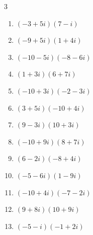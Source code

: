 \begin{multicols}{3}
\begin{enumerate}
        \phantom{$\displaystyle =90+18i$}

  \item $\displaystyle (-3+5i)(7-i)$

        \phantom{$\displaystyle =-16+38i$}

  \item $\displaystyle (-9+5i)(1+4i)$

        \phantom{$\displaystyle =-29-31i$}

  \item $\displaystyle (-10-5i)(-8-6i)$

        \phantom{$\displaystyle =50+100i$}

  \item $\displaystyle (1+3i)(6+7i)$

        \phantom{$\displaystyle =-15+25i$}

  \item $\displaystyle (-10+3i)(-2-3i)$

        \phantom{$\displaystyle =29+24i$}

  \item $\displaystyle (3+5i)(-10+4i)$

        \phantom{$\displaystyle =-50-38i$}

  \item $\displaystyle (9-3i)(10+3i)$

        \phantom{$\displaystyle =99-3i$}

  \item $\displaystyle (-10+9i)(8+7i)$

        \phantom{$\displaystyle =-143+2i$}

  \item $\displaystyle (6-2i)(-8+4i)$

        \phantom{$\displaystyle =-40+40i$}

  \item $\displaystyle (-5-6i)(1-9i)$

        \phantom{$\displaystyle =-59+39i$}

  \item $\displaystyle (-10+4i)(-7-2i)$

        \phantom{$\displaystyle =78-8i$}

  \item $\displaystyle (9+8i)(10+9i)$

        \phantom{$\displaystyle =18+161i$}

  \item $\displaystyle (-5-i)(-1+2i)$


\end{enumerate}
\end{multicols}
